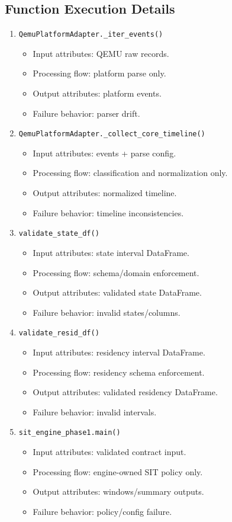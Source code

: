 \documentclass[11pt,a4paper]{article}
\begin{document}
\subsection*{Function Execution Details}
\begin{enumerate}[leftmargin=*]
  \item \texttt{QemuPlatformAdapter.\_iter\_events()}
  \begin{itemize}[leftmargin=*]
    \item Input attributes: QEMU raw records.
    \item Processing flow: platform parse only.
    \item Output attributes: platform events.
    \item Failure behavior: parser drift.
  \end{itemize}
  \item \texttt{QemuPlatformAdapter.\_collect\_core\_timeline()}
  \begin{itemize}[leftmargin=*]
    \item Input attributes: events + parse config.
    \item Processing flow: classification and normalization only.
    \item Output attributes: normalized timeline.
    \item Failure behavior: timeline inconsistencies.
  \end{itemize}
  \item \texttt{validate\_state\_df()}
  \begin{itemize}[leftmargin=*]
    \item Input attributes: state interval DataFrame.
    \item Processing flow: schema/domain enforcement.
    \item Output attributes: validated state DataFrame.
    \item Failure behavior: invalid states/columns.
  \end{itemize}
  \item \texttt{validate\_resid\_df()}
  \begin{itemize}[leftmargin=*]
    \item Input attributes: residency interval DataFrame.
    \item Processing flow: residency schema enforcement.
    \item Output attributes: validated residency DataFrame.
    \item Failure behavior: invalid intervals.
  \end{itemize}
  \item \texttt{sit\_engine\_phase1.main()}
  \begin{itemize}[leftmargin=*]
    \item Input attributes: validated contract input.
    \item Processing flow: engine-owned SIT policy only.
    \item Output attributes: windows/summary outputs.
    \item Failure behavior: policy/config failure.
  \end{itemize}
\end{enumerate}
\end{document}
